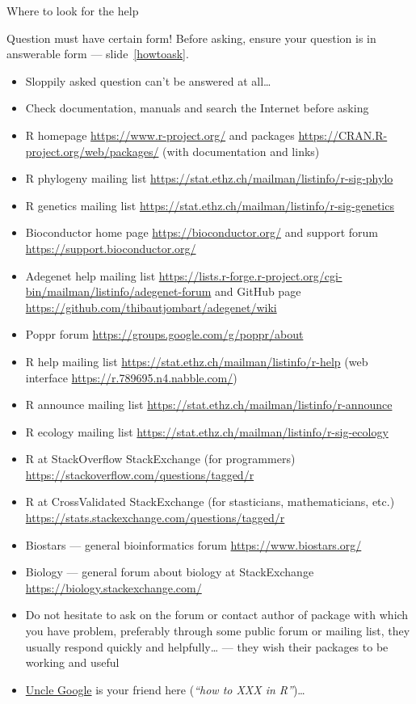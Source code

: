 \documentclass[compress, ucs, xelatex, 11pt, xcolor=svgnames, aspectratio=169,
	hyperref={
		bookmarks=true,
		unicode=true,
		colorlinks=true,
		pdftitle={Molecular data in R},
		plainpages=false,
		pdfauthor={Vojtech Zeisek},
		pdfsubject={Course about phylogeny and evolution in R},
		pdfcreator={XeLaTeX},
		pdfkeywords={R, evolution, phylogeny, molecular data},
		linkcolor=Crimson, %
		anchorcolor=Magenta, %
		citecolor=Magenta, %
		filecolor=Magenta, %
		menucolor=Magenta, %
		urlcolor=DodgerBlue, %
		pdftex},
	url={hyphens, lowtilde} %
	]{beamer}
\begin{document}
\begin{frame}[allowframebreaks]{Where to look for the help}
	\label{help}
	\begin{alertblock}{Question must have certain form!}
			Before asking, \alert{ensure your question is in answerable form} --- slide~\ref{howtoask}.
		\begin{itemize}
			\item Sloppily asked question can't be answered at all\ldots
			\item Check documentation, manuals and search the Internet before asking
		\end{itemize}
	\end{alertblock}
	\begin{itemize}
		\item R homepage \url{https://www.r-project.org/} and packages \url{https://CRAN.R-project.org/web/packages/} (with documentation and links)
		\item R phylogeny mailing list \url{https://stat.ethz.ch/mailman/listinfo/r-sig-phylo}
		\item R genetics mailing list \url{https://stat.ethz.ch/mailman/listinfo/r-sig-genetics}
		\item Bioconductor home page \url{https://bioconductor.org/} and support forum \url{https://support.bioconductor.org/}
		\item Adegenet help mailing list \url{https://lists.r-forge.r-project.org/cgi-bin/mailman/listinfo/adegenet-forum} and GitHub page \url{https://github.com/thibautjombart/adegenet/wiki}
		\item Poppr forum \url{https://groups.google.com/g/poppr/about}
		\item R help mailing list \url{https://stat.ethz.ch/mailman/listinfo/r-help} (web interface \url{https://r.789695.n4.nabble.com/})
		\item R announce mailing list \url{https://stat.ethz.ch/mailman/listinfo/r-announce}
		\item R ecology mailing list \url{https://stat.ethz.ch/mailman/listinfo/r-sig-ecology}
		\item R at StackOverflow StackExchange (for programmers) \url{https://stackoverflow.com/questions/tagged/r}
		\item R at CrossValidated StackExchange (for stasticians, mathematicians, etc.) \url{https://stats.stackexchange.com/questions/tagged/r}
		\item Biostars --- general bioinformatics forum \url{https://www.biostars.org/}
		\item Biology --- general forum about biology at StackExchange \url{https://biology.stackexchange.com/}
		\item Do not hesitate to ask on the forum or contact author of package with which you have problem, preferably through some public forum or mailing list, they usually respond quickly and helpfully\ldots{ }--- they wish their packages to be working and useful
		\item \href{http://rseek.org/}{Uncle Google} is your friend here (\textit{\enquote{how to XXX in R}})\ldots
	\end{itemize}
\end{frame}
\end{document}
